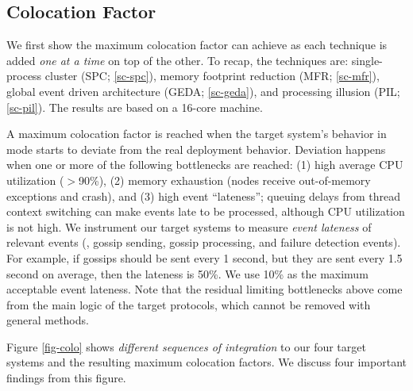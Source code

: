 

\subsection{Colocation Factor}
\label{eval-colo}










We first show the maximum colocation factor \sck can achieve as each
technique is added {\em one at a time} on top of the other.  To recap, the
techniques are: 
single-process cluster (SPC; \sec\ref{sc-spc}), 
memory footprint reduction (MFR; \sec\ref{sc-mfr}),
global event driven architecture (GEDA; \sec\ref{sc-geda}), and 
processing illusion (PIL; \sec\ref{sc-pil}).
%
The results are based on a 16-core machine.



 A maximum colocation factor
is reached when the target system's behavior in \sck mode starts to
deviate from the real deployment behavior.
%
Deviation happens when one or more of the following bottlenecks are
reached:
%
(1) high average CPU utilization ($>$90\%),
%
(2) memory exhaustion (nodes receive out-of-memory exceptions and crash), and
%
(3) high event ``lateness''; 
queuing delays from thread context switching can make events late to be 
processed,
although CPU utilization is not high.
%
We instrument our target systems to measure {\em event lateness} of
relevant events (\eg, gossip sending, gossip processing, and failure
detection events).  For example, if gossips should be sent every 1 second,
but they are sent every 1.5 second on average, then the lateness is 50\%.
%
We use 10\% as the maximum acceptable event lateness.
%
Note that the residual limiting bottlenecks above come from the main logic
of the target protocols, which cannot be removed with general methods.


 Figure \ref{fig-colo} shows {\em
  different sequences of integration} to our four target systems and the
resulting maximum colocation factors.  We discuss four important findings
from this figure.

